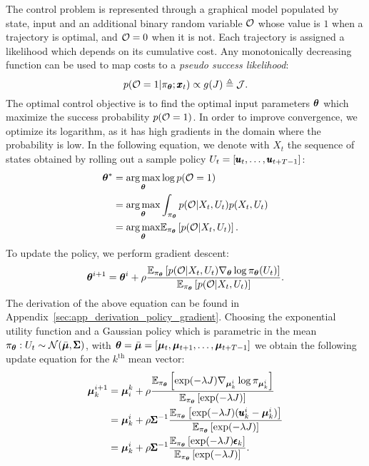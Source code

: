 The control problem is represented through a graphical model populated by state, input and an additional binary random variable $\mathcal{O}$ whose value is $1$ when a trajectory is optimal, and $\mathcal{O} = 0$ when it is not. Each trajectory is assigned a likelihood which depends on its cumulative cost. Any monotonically decreasing function can be used to map costs to a \textit{pseudo success likelihood}:
\begin{equation}
p(\mathcal{O} = 1| \pi_{\boldsymbol{\theta}}; \pmb{x}_t ) \propto g(J) \triangleq \mathcal{J}.
\end{equation}
The optimal control objective is to find the optimal input parameters $\boldsymbol{\theta}$ which maximize the success probability $p(\mathcal{O} = 1)$. In order to improve convergence, we optimize its logarithm, as it has high gradients in the domain where the probability is low. In the following equation, we denote with $X_t$ the sequence of states obtained by rolling out a sample policy $U_t = [\pmb{u}_t, \dots, \pmb{u}_{t+T-1}]$: 
\begin{align}
    \boldsymbol{\theta}^* &= \underset{\boldsymbol{\theta}}{\arg\max} \log p(\mathcal{O} = 1) \\
        &= \underset{\boldsymbol{\theta}}{\arg\max} \int_{\pi_{\boldsymbol{\theta}}} p(\mathcal{O} | X_t, U_t) p(X_t, U_t) \\
        &= \underset{\boldsymbol{\theta}}{\arg\max}  \mathbb{E}_{\pi_{\boldsymbol{\theta}}} \left [p(\mathcal{O} | X_t, U_t)\right]. \label{eq:input_to_params}
\end{align}
To update the policy, we perform gradient descent:
\begin{equation}
    \boldsymbol{\theta}^{i+1} = \boldsymbol{\theta}^i + \rho \frac{\mathbb{E}_{\pi_{\boldsymbol{\theta}}} \left [p(\mathcal{O} | X_t, U_t) \nabla_{ \boldsymbol{\theta}} \log \pi_{\boldsymbol{\theta}} (U_t)\right]}{\mathbb{E}_{\pi_{\boldsymbol{\theta}}} \left [p(\mathcal{O} | X_t, U_t)\right]}.
\end{equation}
The derivation of the above equation can be found in Appendix~\ref{sec:app_derivation_policy_gradient}. 
Choosing the exponential utility function and a Gaussian policy which is parametric in the mean $\pi_{\boldsymbol{\theta}}: U_t \sim \mathcal{N}(\bar{\boldsymbol{\mu}}, \pmb{\Sigma})$, with $\boldsymbol{\theta} = \bar{\boldsymbol{\mu}} = [\boldsymbol{\mu}_t, \boldsymbol{\mu}_{t+1}, \dots, \boldsymbol{\mu}_{t+T-1}]$ we obtain the following update equation for the $k^{\text{th}}$ mean vector:
\begin{align}
    \boldsymbol{\mu}^{i+1}_{k} &=  \boldsymbol{\mu}^{k}_{i} + \rho \frac{\mathbb{E}_{\pi_{\boldsymbol{\theta}}} \left [ \exp( -\lambda J) \nabla_{\boldsymbol{\mu}_{k}^{i}} \log \pi_{\boldsymbol{\mu}^{i}_{k}}\right]}{\mathbb{E}_{\pi_{\boldsymbol{\theta}}} \left [\exp( -\lambda J)\right]} \\
    &= \boldsymbol{\mu}^{i}_{k} +  \rho \pmb{\Sigma}^{-1}\frac{\mathbb{E}_{\pi_{\boldsymbol{\theta}}} \left [\exp( -\lambda J) (\pmb{u}_{k}^{i} - \boldsymbol{\mu}^{i}_{k} )\right]}{\mathbb{E}_{\pi_{\boldsymbol{\theta}}} \left [\exp( -\lambda J)\right]}  \label{eq:bayes_to_mppi} \\
    &= \boldsymbol{\mu}^{i}_{k} +  \rho \pmb{\Sigma}^{-1} \frac{\mathbb{E}_{\pi_{\boldsymbol{\theta}}} \left [\exp( -\lambda J) \pmb{\epsilon}_k \right]}{\mathbb{E}_{\pi_{\boldsymbol{\theta}}} \left [\exp( -\lambda J)\right]}  \label{eq:alpha_assumption}.
\end{align}
